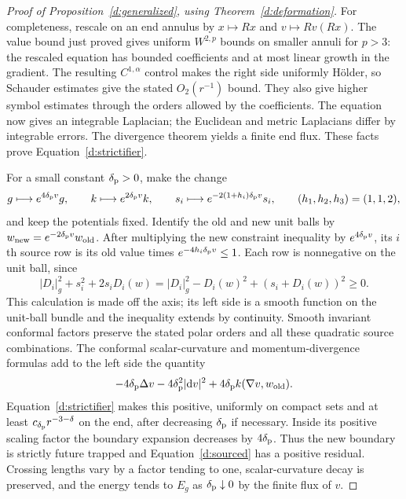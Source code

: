 \begin{proof}[Proof of Proposition~\ref{d:generalized}, using Theorem~\ref{d:deformation}]
For completeness, rescale on an end annulus by $x\mapsto Rx$ and
$v\mapsto Rv(Rx)$.  The value bound just proved gives uniform
$W^{2,p}$ bounds on smaller annuli for $p>3$: the rescaled equation has
bounded coefficients and at most linear growth in the gradient.
The resulting $C^{1,\alpha}$ control makes the right side uniformly
H\"older, so Schauder estimates give the stated $O_2(r^{-1})$ bound.
They also give higher symbol estimates through the orders allowed by
the coefficients.  The equation now gives an integrable Laplacian;
the Euclidean and metric Laplacians differ by integrable errors.
The divergence theorem yields a finite end flux.  These facts prove
Equation~\eqref{d:strictifier}.

For a small constant $\delta_{\rm p}>0$, make the change
\begin{equation}\label{d:strictification}
 g\longmapsto e^{4\delta_{\rm p}v}g,\qquad
 k\longmapsto e^{2\delta_{\rm p}v}k,\qquad
 s_i\longmapsto e^{-2(1+h_i)\delta_{\rm p}v}s_i,\qquad
 (h_1,h_2,h_3)=(1,1,2),
\end{equation}
and keep the potentials fixed.  Identify the old and new unit balls
by $w_{\rm new}=e^{-2\delta_{\rm p}v}w_{\rm old}$.  After multiplying
the new constraint inequality by $e^{4\delta_{\rm p}v}$, its $i$th
source row is its old value times $e^{-4h_i\delta_{\rm p}v}\le1$.
Each row is nonnegative on the unit ball, since
\[
 |D_i|_g^2+s_i^2+2s_iD_i(w)
 =|D_i|_g^2-D_i(w)^2+(s_i+D_i(w))^2\ge0.
\]
This calculation is made off the axis; its left side is a smooth
function on the unit-ball bundle and the inequality extends by
continuity.  Smooth invariant conformal factors preserve the stated
polar orders and all these quadratic source combinations.
The conformal scalar-curvature and momentum-divergence formulas add
to the left side the quantity
\[
 -4\delta_{\rm p}\Delta v-4\delta_{\rm p}^2|\mathrm d v|^2
       +4\delta_{\rm p}k(\nabla v,w_{\rm old}).
\]
Equation~\eqref{d:strictifier} makes this positive, uniformly on compact
sets and at least $c_{\delta_{\rm p}}r^{-3-\delta}$ on the end, after
decreasing $\delta_{\rm p}$ if necessary.  Inside its positive scaling
factor the boundary expansion decreases by $4\delta_{\rm p}$.
Thus the new boundary is strictly future trapped and
Equation~\eqref{d:sourced} has a positive residual.  Crossing
lengths vary by a factor tending to one, scalar-curvature decay is
preserved, and the energy tends to $E_g$ as $\delta_{\rm p}\downarrow0$
by the finite flux of $v$.


\end{proof}

